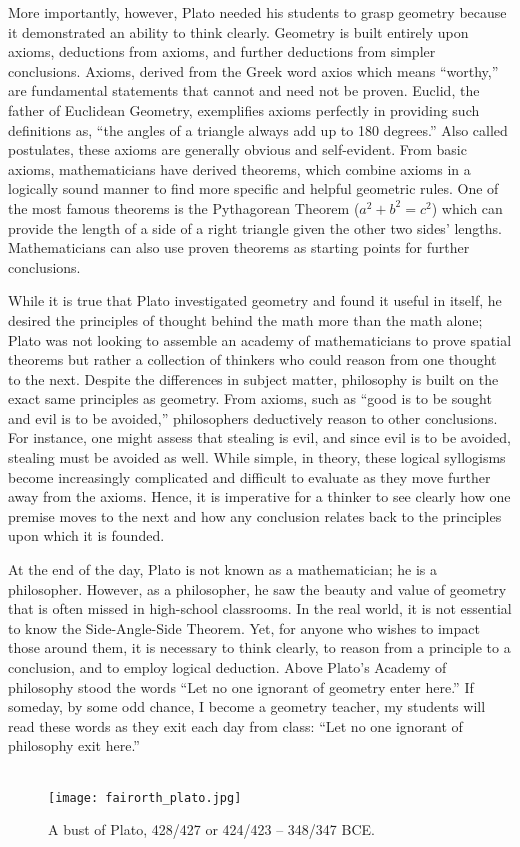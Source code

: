 More importantly, however, Plato needed his students to grasp geometry because it demonstrated an ability to think clearly. Geometry is built entirely upon axioms, deductions from axioms, and further deductions from simpler conclusions. Axioms, derived from the Greek word axios which means “worthy,” are fundamental statements that cannot and need not be proven. Euclid, the father of Euclidean Geometry, exemplifies axioms perfectly in providing such definitions as, “the angles of a triangle always add up to 180 degrees.” Also called postulates, these axioms are generally obvious and self-evident. From basic axioms, mathematicians have derived theorems, which combine axioms in a logically sound manner to find more specific and helpful geometric rules. One of the most famous theorems is the Pythagorean Theorem ($a^2 + b^2 = c^2$) which can provide the length of a side of a right triangle given the other two sides’ lengths. Mathematicians can also use proven theorems as starting points for further conclusions. 

While it is true that Plato investigated geometry and found it useful in itself, he desired the principles of thought behind the math more than the math alone; Plato was not looking to assemble an academy of mathematicians to prove spatial theorems but rather a collection of thinkers who could reason from one thought to the next. Despite the differences in subject matter, philosophy is built on the exact same principles as geometry. From axioms, such as “good is to be sought and evil is to be avoided,” philosophers deductively reason to other conclusions. For instance, one might assess that stealing is evil, and since evil is to be avoided, stealing must be avoided as well. While simple, in theory, these logical syllogisms become increasingly complicated and difficult to evaluate as they move further away from the axioms. Hence, it is imperative for a thinker to see clearly how one premise moves to the next and how any conclusion relates back to the principles upon which it is founded. 

At the end of the day, Plato is not known as a mathematician; he is a philosopher. However, as a philosopher, he saw the beauty and value of geometry that is often missed in high-school classrooms. In the real world, it is not essential to know the Side-Angle-Side Theorem. Yet, for anyone who wishes to impact those around them, it is necessary to think clearly, to reason from a principle to a conclusion, and to employ logical deduction. Above Plato’s Academy of philosophy stood the words “Let no one ignorant of geometry enter here.” If someday, by some odd chance, I become a geometry teacher, my students will read these words as they exit each day from class: “Let no one ignorant of philosophy exit here.”\\\\

\begin{figure}[h]
  \begin{center}
    \texttt{[image: fairorth\_plato.jpg]}
  \end{center}
  \caption{A bust of Plato, 428/427 or 424/423 – 348/347 BCE.}
\end{figure}
